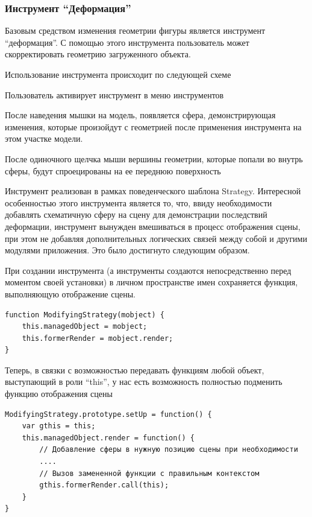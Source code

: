 \documentclass[12pt, a4paper]{article}
\begin{document}
\subsubsection{Инструмент ``Деформация''}

Базовым средством изменения геометрии фигуры является инструмент ``деформация''.
С помощью этого инструмента пользователь может скорректировать геометрию
загруженного объекта.

Использование инструмента происходит по следующей схеме

\begin{enumeration}
    \item Пользователь активирует инструмент в меню инструментов
    \item После наведения мышки на модель, появляется сфера, демонстрирующая
    изменения, которые произойдут с геометрией после применения инструмента на
    этом участке модели.
    \item После одиночного щелчка мыши вершины геометрии, которые попали во
    внутрь сферы, будут спроецированы на ее переднюю поверхность
\end{enumeration}

Инструмент реализован в рамках поведенческого шаблона Strategy. Интересной
особенностью этого инструмента является то, что, ввиду необходимости добавлять
схематичную сферу на сцену для демонстрации последствий деформации, инструмент
вынужден вмешиваться в процесс отображения сцены, при этом не добавляя
дополнительных логических связей между собой и другими модулями приложения. Это
было достигнуто следующим образом.

При создании инструмента (а инструменты создаются непосредственно перед моментом
своей установки) в личном пространстве имен сохраняется функция,
выполняющую отображение сцены.

\begin{lstlisting}
function ModifyingStrategy(mobject) {
    this.managedObject = mobject;
    this.formerRender = mobject.render;
}
\end{lstlisting}

Теперь, в связки с возможностью передавать функциям любой объект,
выступающий в роли ``this'', у нас есть возможность полностью подменить функцию
отображения сцены

\begin{lstlisting}
ModifyingStrategy.prototype.setUp = function() {
    var gthis = this;
    this.managedObject.render = function() {
        // Добавление сферы в нужную позицию сцены при необходимости
        ....
        // Вызов замененной функции с правильным контекстом
        gthis.formerRender.call(this);
    }
}
\end{lstlisting}
\end{document}
